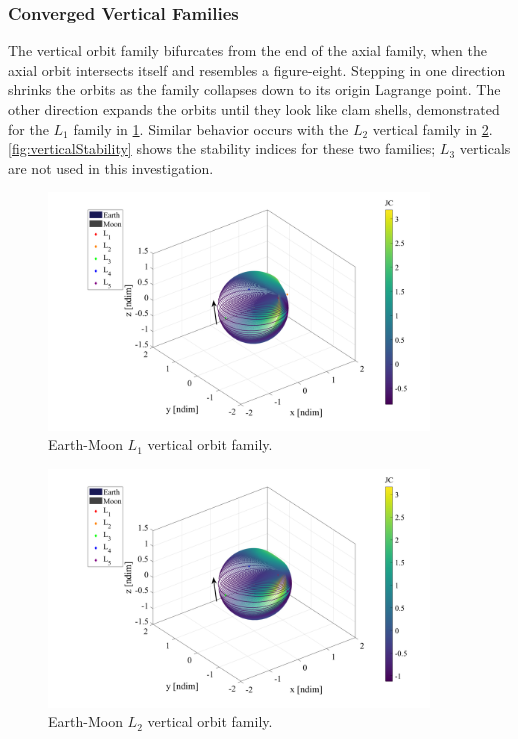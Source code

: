 \subsubsection{Converged Vertical Families}
The vertical orbit family bifurcates from the end of the axial family, when the axial orbit
intersects itself and resembles a figure-eight. Stepping in one direction shrinks the orbits as the
family collapses down to its origin Lagrange point. The other direction expands the orbits until
they look like clam shells, demonstrated for the $L_{1}$ family in \cref{fig:L1Vertical}. Similar
behavior occurs with the $L_{2}$ vertical family in \cref{fig:L2Vertical}.
\cref{fig:verticalStability} shows the stability indices for these two families; $L_{3}$ verticals
are not used in this investigation.

\begin{figure}[ht]
    \centering
    \includegraphics[width=0.9\textwidth]{figures/L1VerticalFamily.pdf}
    \caption{Earth-Moon $L_{1}$ vertical orbit family.}
    \label{fig:L1Vertical}
\end{figure}

\begin{figure}[ht]
    \centering
    \includegraphics[width=0.9\textwidth]{figures/L2VerticalFamily.pdf}
    \caption{Earth-Moon $L_{2}$ vertical orbit family.}
    \label{fig:L2Vertical}
\end{figure}

